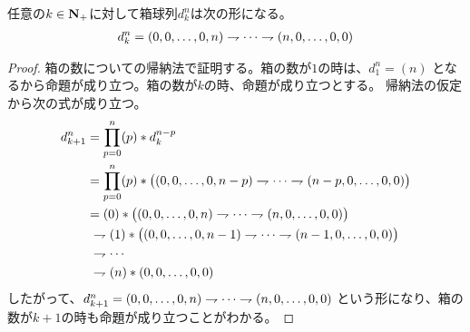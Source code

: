 	\begin{proposition}[辞書式順序の箱球列の両端]\label{prop:辞書式順序の箱球列の両端} %
		任意の$k\in{\mathbf{N}}_+$に対して箱球列$d_k^n$は次の形になる。
		\begin{equation*}\begin{split} %
			d_k^n = (0,0,\dots,0,n)\tugi\cdots\tugi (n,0,\dots,0,0)
		\end{split}\end{equation*} %
	\end{proposition} %
	\begin{proof} %
		箱の数についての帰納法で証明する。箱の数が$1$の時は、$d_1^n=(n)$
		となるから命題が成り立つ。箱の数が$k$の時、命題が成り立つとする。
		帰納法の仮定から次の式が成り立つ。
		\begin{equation*}\begin{split} %
			d_{k+1}^n &= \prod_{p=0}^n(p)*d_k^{n-p} \\
			&= \prod_{p=0}^n(p)*
				\bigl((0,0,\dots,0,n-p)\tugi\cdots\tugi(n-p,0,\dots,0,0)\bigr) \\
			&= (0)*\bigl((0,0,\dots,0,n)\tugi\cdots\tugi(n,0,\dots,0,0)\bigr) \\
			&\; \tugi(1)*\bigl((0,0,\dots,0,n-1)\tugi\cdots\tugi(n-1,0,\dots,0,0)\bigr) \\
			&\; \tugi\cdots \\
			&\; \tugi(n)*(0,0,\dots,0,0) \\
		\end{split}\end{equation*} %
		したがって、$d_{k+1}^n=(0,0,\dots,0,n)\rightharpoondown\cdots\rightharpoondown(n,0,\dots,0,0)$
		という形になり、箱の数が$k+1$の時も命題が成り立つことがわかる。
	\end{proof} %


